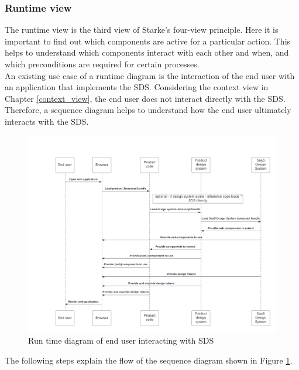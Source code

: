 \subsubsection{Runtime view}
The runtime view is the third view of Starke's four-view principle. Here it is important to find out which components are active for a particular action. This helps to understand which components interact with each other and when, and which preconditions are required for certain processes. \citep{starke_effektive_2020}\\
An existing use case of a runtime diagram is the interaction of the end user with an application that implements the \ac{SDS}. Considering the context view in Chapter \ref{context_view}, the end user does not interact directly with the \ac{SDS}. Therefore, a sequence diagram helps to understand how the end user ultimately interacts with the \ac{SDS}. \\
\begin{figure}[htb]
    \centerline{
    \includegraphics[width=\linewidth]{images/runtime_diagram_sds.png}}
\caption{Run time diagram of end user interacting with \ac{SDS}}
\label{runtime_diagram_sds}
\end{figure}
The following steps explain the flow of the sequence diagram shown in Figure \ref{runtime_diagram_sds}.
